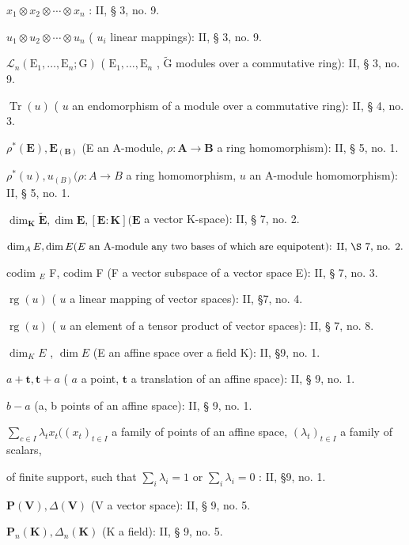 \(x_{1} \otimes x_{2} \otimes \cdots \otimes x_{n}\) : II, § 3, no. 9.

\(u_{1} \otimes u_{2} \otimes \cdots \otimes u_{n}\) ( \(u_{i}\) linear mappings): II, § 3, no. 9.

\(\mathcal{L}_n(\mathrm{E}_1, \ldots, \mathrm{E}_n; \mathrm{G})\) ( \(\mathrm{E}_1, \ldots, \mathrm{E}_n\) , \(\tilde{\mathrm{G}}\) modules over a commutative ring): II, § 3, no. 9.

\(\operatorname{Tr}(u)\) ( \(u\) an endomorphism of a module over a commutative ring): II, § 4, no. 3.

\(\rho^{*}(\mathbf{E}), \mathbf{E}_{(\mathbf{B})}\) (E an A-module, \(\rho: \mathbf{A} \to \mathbf{B}\) a ring homomorphism): II, § 5, no. 1.

\(\rho^{*}(u), u_{(B)} (\rho: A \to B\) a ring homomorphism, \(u\) an A-module homomorphism): II, § 5, no. 1.

\(\dim_{\mathbf{K}} \tilde{\mathbf{E}}, \dim \mathbf{E}, [\mathbf{E} : \mathbf{K}] (\mathbf{E}\) a vector K-space): II, § 7, no. 2.

\(\dim_{A} E, \dim E (E \text{ an A-module any two bases of which are equipotent): II, \S 7, \text{no. 2.}}\)

codim \(_{E}\) F, codim F (F a vector subspace of a vector space E): II, § 7, no. 3.

\(\operatorname{rg}(u)\) ( \(u\) a linear mapping of vector spaces): II, §7, no. 4.

\(\operatorname{rg}(u)\) ( \(u\) an element of a tensor product of vector spaces): II, § 7, no. 8.

\(\dim_{K}E\) , \(\dim E\) (E an affine space over a field K): II, §9, no. 1.

\(a + \mathbf{t},\mathbf{t} + a\) ( \(a\) a point, \(\mathbf{t}\) a translation of an affine space): II, § 9, no. 1.

\(b - a\) (a, b points of an affine space): II, § 9, no. 1.

\(\sum_{c \in I} \lambda_t x_t ((x_t)_{t \in I}\) a family of points of an affine space, \((\lambda_t)_{t \in I}\) a family of scalars,

of finite support, such that \(\sum_{i} \lambda_{i} = 1\) or \(\sum_{i} \lambda_{i} = 0\) : II, §9, no. 1.

\(\mathbf{P}(\mathbf{V}), \Delta(\mathbf{V})\) (V a vector space): II, § 9, no. 5.

\(\mathbf{P}_n(\mathbf{K}), \Delta_n(\mathbf{K})\) (K a field): II, § 9, no. 5.

